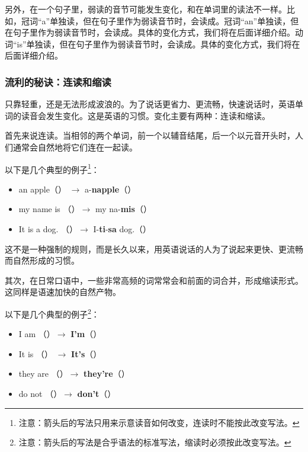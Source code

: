 \documentclass[10.5pt, a4paper]{ctexbook} %
\begin{document}
另外，在一个句子里，弱读的音节可能发生变化，和在单词里的读法不一样。比如，冠词“a”单独读，但在句子里作为弱读音节时，会读成。冠词“an”单独读，但在句子里作为弱读音节时，会读成。具体的变化方式，我们将在后面详细介绍。动词“is”单独读，但在句子里作为弱读音节时，会读成。具体的变化方式，我们将在后面详细介绍。

\subsubsection*{流利的秘诀：连读和缩读}

只靠轻重，还是无法形成波浪的。为了说话更省力、更流畅，快速说话时，英语单词的读音会发生变化。这是英语的习惯。变化主要有两种：连读和缩读。

首先来说连读。当相邻的两个单词，前一个以辅音结尾，后一个以元音开头时，人们通常会自然地将它们连在一起读。

以下是几个典型的例子\footnote{注意：箭头后的写法只用来示意读音如何改变，连读时不能按此改变写法。}：
\begin{itemize}
\item an apple（） $\rightarrow$ a-\textbf{napple}（）
\item my name is （）$\rightarrow$ my na-\textbf{mis}（）
\item It is a dog. （）$\rightarrow$ I-\textbf{ti}-\textbf{sa} dog.（）
\end{itemize}

这不是一种强制的规则，而是长久以来，用英语说话的人为了说起来更快、更流畅而自然形成的习惯。

其次，在日常口语中，一些非常高频的词常常会和前面的词合并，形成缩读形式。这同样是语速加快的自然产物。

以下是几个典型的例子\footnote{注意：箭头后的写法是合乎语法的标准写法，缩读时必须按此改变写法。}：
\begin{itemize}
\item I am （）$\rightarrow$ \textbf{I'm}（）
\item It is （） $\rightarrow$ \textbf{It's}（）
\item they are （）$\rightarrow$ \textbf{they're}（）
\item do not （）$\rightarrow$ \textbf{don't}（）
\end{itemize}
\end{document}
